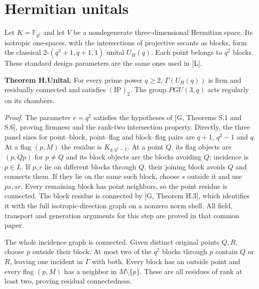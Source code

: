 \section{Hermitian unitals}
Let $K=\mathbb F_{q^2}$ and let $V$ be a nondegenerate three-dimensional
Hermitian space. Its isotropic one-spaces, with the intersections of
projective secants as blocks, form the classical
$2$-$(q^3+1,q+1,1)$ unital $U_H(q)$. Each point belongs to $q^2$ blocks.
These standard design parameters are the same ones used in [L].

\textbf{Theorem H.Unital.}
For every prime power $q\geq2$, $\Gamma(U_H(q))$ is firm and residually
connected and satisfies $(\mathrm{IP})_2$. The group $PGU(3,q)$ acts
regularly on its chambers.

\emph{Proof.}
The parameter $r=q^2$ satisfies the hypotheses of [G, Theorems S.1 and
S.6], proving firmness and the rank-two intersection property. Directly,
the three panel sizes for point--block, point--flag and block--flag pairs
are $q+1$, $q^2-1$ and $q$.
At a flag $(p,M)$ the residue is $K_{q,q^2-1}$. At a point $Q$, its flag
objects are $(p,Qp)$ for $p\ne Q$ and its block objects are the blocks
avoiding $Q$; incidence is $p\in L$. If $p,r$ lie on different blocks
through $Q$, their joining block avoids $Q$ and connects them. If they
lie on the same such block, choose $s$ outside it and use $ps,sr$.
Every remaining block has point neighbors, so the point residue is
connected. The block residue is connected by [G, Theorem H.3], which
identifies it with the full isotropic-direction graph on a nonzero norm
shell. All field, transport and generation arguments for this step are
proved in that common paper.

The whole incidence graph is connected. Given distinct original points
$Q,R$, choose $p$ outside their block. At most two of the $q^2$ blocks
through $p$ contain $Q$ or $R$, leaving one incident in $\Gamma$ with
both. Every block has an outside point and every flag $(p,M)$ has a
neighbor in $M\setminus\{p\}$. These are all residues of rank at least
two, proving residual connectedness.

